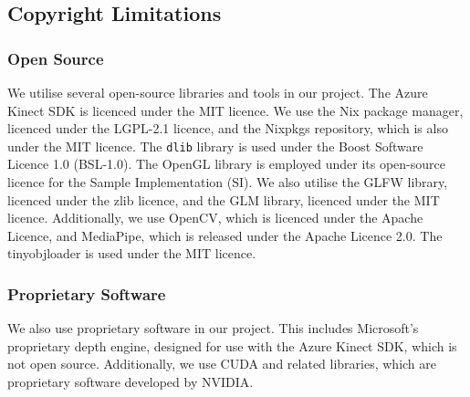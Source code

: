 \subsection{Copyright Limitations}
\subsubsection{Open Source}
We utilise several open-source libraries and tools in our project. The Azure Kinect SDK is licenced under the MIT licence. We use the Nix package manager, licenced under the LGPL-2.1 licence, and the Nixpkgs repository, which is also under the MIT licence. The \texttt{dlib} library is used under the Boost Software Licence 1.0 (BSL-1.0). The OpenGL library is employed under its open-source licence for the Sample Implementation (SI). We also utilise the GLFW library, licenced under the zlib licence, and the GLM library, licenced under the MIT licence. Additionally, we use OpenCV, which is licenced under the Apache Licence, and MediaPipe, which is released under the Apache Licence 2.0. The tinyobjloader is used under the MIT licence.

\subsubsection{Proprietary Software}
We also use proprietary software in our project. This includes Microsoft's proprietary depth engine, designed for use with the Azure Kinect SDK, which is not open source. Additionally, we use CUDA and related libraries, which are proprietary software developed by NVIDIA.
